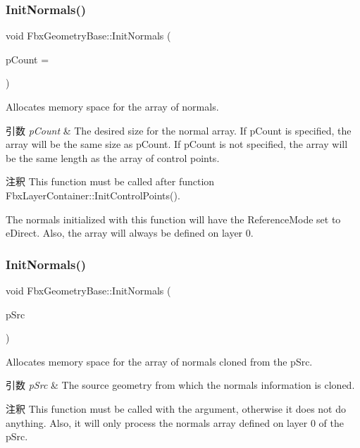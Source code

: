\subsubsection{\texorpdfstring{Init\+Normals()}{InitNormals()}\hspace{0.1cm}{\footnotesize\ttfamily [1/2]}}
{\footnotesize\ttfamily void Fbx\+Geometry\+Base\+::\+Init\+Normals (\begin{DoxyParamCaption}\item[{int}]{p\+Count = {} }\end{DoxyParamCaption})}

Allocates memory space for the array of normals. 
\begin{DoxyParams}{引数}
{\em p\+Count} & The desired size for the normal array. If p\+Count is specified, the array will be the same size as p\+Count. If p\+Count is not specified, the array will be the same length as the array of control points. \\
\hline
\end{DoxyParams}
\begin{DoxyRemark}{注釈}
This function must be called after function Fbx\+Layer\+Container\+::\+Init\+Control\+Points(). 

The normals initialized with this function will have the Reference\+Mode set to e\+Direct. Also, the array will always be defined on layer 0. 
\end{DoxyRemark}
\mbox{\label{class_fbx_geometry_base_ab0eed06f53d189b6c81560b78905c9b0}} 
\subsubsection{\texorpdfstring{Init\+Normals()}{InitNormals()}\hspace{0.1cm}{\footnotesize\ttfamily [2/2]}}
{\footnotesize\ttfamily void Fbx\+Geometry\+Base\+::\+Init\+Normals (\begin{DoxyParamCaption}\item[{\hyperlink{class_fbx_geometry_base}{Fbx\+Geometry\+Base} $\ast$}]{p\+Src }\end{DoxyParamCaption})}

Allocates memory space for the array of normals cloned from the p\+Src. 
\begin{DoxyParams}{引数}
{\em p\+Src} & The source geometry from which the normals information is cloned. \\
\hline
\end{DoxyParams}
\begin{DoxyRemark}{注釈}
This function must be called with the argument, otherwise it does not do anything. Also, it will only process the normals array defined on layer 0 of the p\+Src. 
\end{DoxyRemark}
\mbox{\label{class_fbx_geometry_base_ac5b188a0deba5132de9805538f014799}} 
